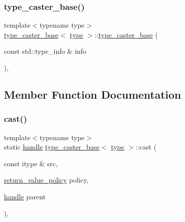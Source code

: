 \subsubsection{\texorpdfstring{type\_caster\_base()}{type\_caster\_base()}\hspace{0.1cm}{\footnotesize\ttfamily [2/2]}}
{\footnotesize\ttfamily template$<$typename type$>$ \\
\mbox{\hyperlink{classtype__caster__base}{type\+\_\+caster\+\_\+base}}$<$ \mbox{\hyperlink{_s_d_l__opengl_8h_ad5ddf6fca7b585646515660e810e0188}{type}} $>$\+::\mbox{\hyperlink{classtype__caster__base}{type\+\_\+caster\+\_\+base}} (\begin{DoxyParamCaption}\item[{const std\+::type\+\_\+info \&}]{info }\end{DoxyParamCaption})\hspace{0.3cm}{\ttfamily [inline]}, {\ttfamily [explicit]}}



\subsection{Member Function Documentation}
\mbox{\label{classtype__caster__base_acd5bd2fafc86fb3160c7955bfc2f88de}} 
\subsubsection{\texorpdfstring{cast()}{cast()}\hspace{0.1cm}{\footnotesize\ttfamily [1/3]}}
{\footnotesize\ttfamily template$<$typename type$>$ \\
static \mbox{\hyperlink{classhandle}{handle}} \mbox{\hyperlink{classtype__caster__base}{type\+\_\+caster\+\_\+base}}$<$ \mbox{\hyperlink{_s_d_l__opengl_8h_ad5ddf6fca7b585646515660e810e0188}{type}} $>$\+::cast (\begin{DoxyParamCaption}\item[{const itype \&}]{src,  }\item[{\mbox{\hyperlink{detail_2common_8h_adde72ab1fb0dd4b48a5232c349a53841}{return\+\_\+value\+\_\+policy}}}]{policy,  }\item[{\mbox{\hyperlink{classhandle}{handle}}}]{parent }\end{DoxyParamCaption})\hspace{0.3cm}{\ttfamily [inline]}, {\ttfamily [static]}}

